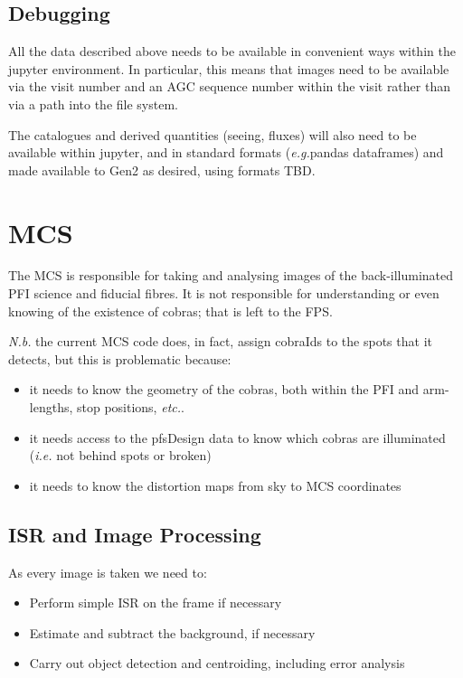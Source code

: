 \documentclass[12pt]{article}
\newcommand{\eg}{\textit{e.g.}\xspace}
\newcommand{\etc}{\textit{etc.}\xspace}
\newcommand{\ie}{\textit{i.e.}\xspace}
\newcommand{\Nb}{\textit{N.b.}\xspace}
\newcommand{\AGC}{\gls{AGC}\xspace}
\newcommand{\MCS}{\gls{MCS}\xspace}
\newcommand{\FPS}{\gls{FPS}\xspace}
\newcommand{\PFI}{\gls{PFI}\xspace}
\newcommand{\TBD}{\gls{TBD}\xspace}
\newcommand{\jupyter}{\gls{jupyter}\xspace}
\begin{document}
\subsection{Debugging}

All the data described above needs to be available in convenient ways within the \jupyter environment.  In
particular, this means that images need to be available via the \gls{visit} number and an \AGC sequence number
within the visit rather than via a path into the file system.

The catalogues and derived quantities (seeing, fluxes) will also need to be available within \jupyter, and
in standard formats (\eg \gls{pandas} dataframes) and made available to \gls{Gen2} as desired, using
formats \TBD.

\section{MCS}
\label{sec:MCS}

The \MCS is responsible for taking and analysing images of the back-illuminated PFI science and fiducial
fibres.  It is not responsible for understanding or even knowing of the existence of cobras; that is left to the \FPS.

\Nb the current \MCS code does, in fact, assign cobraIds to the spots that it detects, but this
is problematic because:
\begin{itemize}
\item it needs to know the geometry of the cobras, both within the \PFI and arm-lengths, stop positions, \etc.
\item it needs access to the \gls{pfsDesign} data to know which cobras are illuminated
  (\ie not behind spots or broken)
\item it needs to know the distortion maps from sky to \MCS coordinates
\end{itemize}

\subsection{ISR and Image Processing}

As every image is taken we need to:
\begin{itemize}
  \item Perform simple \gls{ISR} on the frame if necessary
  \item Estimate and subtract the background, if necessary
  \item Carry out object detection and centroiding, including error analysis
\end{itemize}
\end{document}
